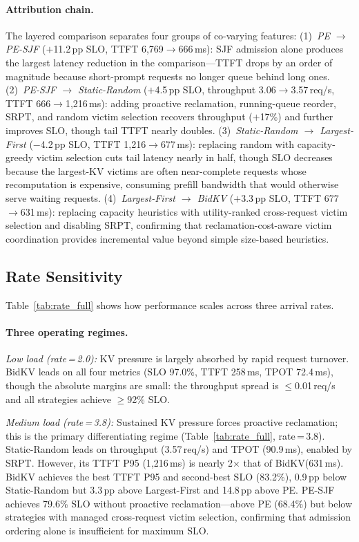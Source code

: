 \documentclass[sigconf,nonacm]{acmart}
\newcommand{\bidkv}{BidKV\xspace}
\begin{document}
\paragraph{Attribution chain.}
The layered comparison separates four groups of co-varying features:
(1)~\emph{PE $\to$ PE-SJF} ($+$11.2\,pp SLO, TTFT 6{,}769$\to$666\,ms):
  SJF admission alone produces the largest latency reduction in the
  comparison---TTFT drops by an order of magnitude because short-prompt
  requests no longer queue behind long ones.
(2)~\emph{PE-SJF $\to$ Static-Random} ($+$4.5\,pp SLO,
  throughput 3.06$\to$3.57\,req/s, TTFT 666$\to$1{,}216\,ms):
  adding proactive reclamation, running-queue reorder, SRPT, and random
  victim selection recovers throughput ($+$17\%) and further improves SLO,
  though tail TTFT nearly doubles.
(3)~\emph{Static-Random $\to$ Largest-First} ($-$4.2\,pp SLO,
  TTFT 1{,}216$\to$677\,ms):
  replacing random with capacity-greedy victim selection cuts tail latency
  nearly in half, though SLO decreases because the largest-KV victims are
  often near-complete requests whose recomputation is expensive, consuming
  prefill bandwidth that would otherwise serve waiting requests.
(4)~\emph{Largest-First $\to$ BidKV} ($+$3.3\,pp SLO,
  TTFT 677$\to$631\,ms):
  replacing capacity heuristics with utility-ranked cross-request victim
  selection and disabling SRPT, confirming that reclamation-cost-aware victim
  coordination provides incremental value beyond simple size-based
  heuristics.

\subsection{Rate Sensitivity}\label{sec:eval:rate}



Table~\ref{tab:rate_full} shows how performance scales across three arrival
rates.

\paragraph{Three operating regimes.}

\emph{Low load (rate\,=\,2.0):}
KV pressure is largely absorbed by rapid request turnover.  \bidkv leads on
all four metrics (SLO 97.0\%, TTFT 258\,ms, TPOT 72.4\,ms), though the
absolute margins are small: the throughput spread is $\leq$0.01\,req/s and
all strategies achieve $\geq$92\% SLO.

\emph{Medium load (rate\,=\,3.8):}
Sustained KV pressure forces proactive reclamation; this is the primary
differentiating regime (Table~\ref{tab:rate_full}, rate\,=\,3.8).  Static-Random leads on
throughput (3.57\,req/s) and TPOT (90.9\,ms), enabled by SRPT.  However,
its TTFT P95 (1{,}216\,ms) is nearly 2$\times$ that of \bidkv (631\,ms).
\bidkv achieves the best TTFT P95 and second-best SLO (83.2\%), 0.9\,pp
below Static-Random but 3.3\,pp above Largest-First and 14.8\,pp above PE.
PE-SJF achieves 79.6\% SLO without proactive reclamation---above PE
(68.4\%) but below strategies with managed cross-request victim selection, confirming that
admission ordering alone is insufficient for maximum SLO.
\end{document}
